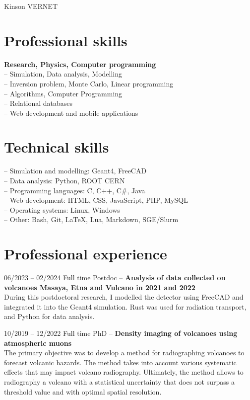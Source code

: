 \documentclass[
	10pt,
]{FreemanCV}
\begin{document}
\begin{paracol}{2}

\parbox[][0.11\textheight][c]{\linewidth}{
	\centering
	
	{\sffamily\Huge Kinson VERNET}
}


\section{Professional skills}

\jobentry
	{}
	{}
	{}
	{}
	{\textbf{Research, Physics, Computer programming}}\\
	{	
	-- Simulation, Data analysis, Modelling\\
	-- Inversion problem, Monte Carlo, Linear programming\\
	-- Algorithms, Computer Programming\\
	-- Relational databases\\
	-- Web development and mobile applications
	}
\medskip


\section{Technical skills}

\jobentry
	{}
	{}
	{}
	{}
	{
	-- Simulation and modelling: Geant4, FreeCAD\\
	-- Data analysis: Python, ROOT CERN\\
	-- Programming languages: C, C++, C\#, Java\\
	-- Web development: HTML, CSS, JavaScript, PHP, MySQL\\
	-- Operating systems: Linux, Windows\\
	-- Other: Bash, Git, LaTeX, Lua, Markdown, SGE/Slurm
	}
\medskip


\section{Professional experience}

\jobentry
	{06/2023 -- 02/2024}
	{Full time}
	{Postdoc -- \uca}
	{}
	{\textbf{Analysis of data collected on volcanoes Masaya, Etna and
Vulcano in 2021 and 2022}}\\
	{
		During this postdoctoral research, I modelled the detector using FreeCAD and integrated it into the Geant4 simulation. Rust was used for radiation transport, and Python for data analysis.
	}
\medskip
\medskip

\jobentry
	{10/2019 -- 12/2022}
	{Full time}
	{PhD -- \uca}
	{}{}
	{\textbf{Density imaging of volcanoes using atmospheric muons}}\\
	{
		The primary objective was to develop a method for radiographing volcanoes to forecast volcanic hazards. The method takes into account various systematic effects that may impact volcano radiography. Ultimately, the method allows to radiography a volcano with a statistical uncertainty that does not surpass a threshold value and with optimal spatial resolution.
	}
\medskip
\medskip


\end{paracol}
\end{document}
